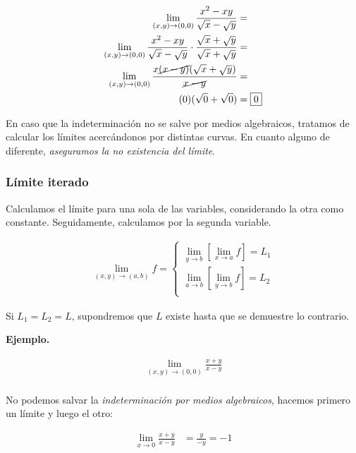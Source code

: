 \begin{align*}
    \lim_{(x,y) \to (0,0)}\frac{x^{2} - xy}{\sqrt{x}-\sqrt{y}}      & =           \\
    \lim_{(x,y) \to (0,0)}\frac{x^{2} - xy}{\sqrt{x}-\sqrt{y}} \cdot
    \frac{\sqrt{x} + \sqrt{y}}{\sqrt{x} + \sqrt{y}}                 & =           \\
    \lim_{(x,y) \to (0,0)}
    \frac{x \cancel{(x - y)} (\sqrt{x} + \sqrt{y})}{\cancel{x - y}} & =           \\
    (0)(\sqrt{0} + \sqrt{0})                                        & = \boxed{0}
\end{align*}

En caso que la indeterminación no se salve por medios algebraicos,
tratamos de calcular los límites acercándonos por distintas curvas.
En cuanto alguno de diferente,
\textit{aseguramos la no existencia del límite}.

\subsubsection{Límite iterado}

Calculamos el límite para una sola de las variables,
considerando la otra como constante.
Seguidamente, calculamos por la segunda variable.

\begin{align*}
    \lim_{(x,y) \to (a,b)} f =
    \begin{cases}
        \lim_{y \to b}\left[ \lim_{x \to a} f \right] = L_1 \\
        \lim_{a \to b}\left[ \lim_{y \to b} f \right] = L_2 \\
    \end{cases}
\end{align*}

Si \(L_1 = L_2 = L\),
supondremos que \(L\) existe hasta que se demuestre lo contrario.

\textbf{Ejemplo.}

\begin{align*}
    \lim_{(x,y) \to (0,0)} \frac{x + y}{x - y} \\
\end{align*}

No podemos salvar la \textit{indeterminación por medios algebraicos},
hacemos primero un límite y luego el otro:

\begin{align*}
    \lim_{x \to 0} \frac{x + y}{x - y} & = \frac{y}{-y} = \boxed{-1}
\end{align*}

